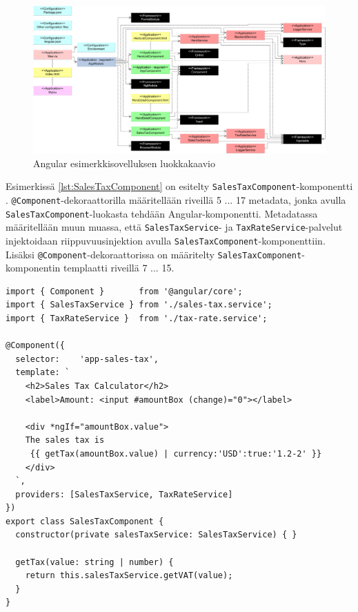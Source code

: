 \documentclass[finnish]{tktltiki2}
\theoremstyle{definition}
\theoremstyle{remark}
\numberwithin{figure}{section}
\begin{document}
\begin{figure}[H]
  \centering
  \includegraphics[width=14cm]{images/UMLDiagramExampleApp.png}
  \caption{Angular esimerkkisovelluksen luokkakaavio}
  \label{fig:UMLDiagramExampleApp}
\end{figure}

Esimerkissä \ref{lst:SalesTaxComponent} on esitelty \texttt{SalesTaxComponent}-komponentti \cite{ExampleApplication}. \texttt{@Component}-dekoraattorilla määritellään riveillä 5 ... 17 metadata, jonka avulla \texttt{SalesTaxComponent}-luokasta tehdään Angular-komponentti. Metadatassa määritellään muun muassa, että \texttt{SalesTaxService}- ja \texttt{TaxRateService}-palvelut injektoidaan riippuvuusinjektion avulla \texttt{SalesTaxComponent}-komponenttiin. Lisäksi \texttt{@Component}-dekoraattorissa on määritelty \texttt{SalesTaxComponent}-komponentin templaatti riveillä 7 ... 15. 

\begin{lstlisting}[style=htmlcssjs, caption=SalesTaxComponent-komponentti \protect\cite{ExampleApplication}, label=lst:SalesTaxComponent ]
import { Component }       from '@angular/core';
import { SalesTaxService } from './sales-tax.service';
import { TaxRateService }  from './tax-rate.service';

@Component({
  selector:    'app-sales-tax',
  template: `
    <h2>Sales Tax Calculator</h2>
    <label>Amount: <input #amountBox (change)="0"></label>

    <div *ngIf="amountBox.value">
    The sales tax is
     {{ getTax(amountBox.value) | currency:'USD':true:'1.2-2' }}
    </div>
  `,
  providers: [SalesTaxService, TaxRateService]
})
export class SalesTaxComponent {
  constructor(private salesTaxService: SalesTaxService) { }

  getTax(value: string | number) {
    return this.salesTaxService.getVAT(value);
  }
}
\end{lstlisting}
\end{document}
